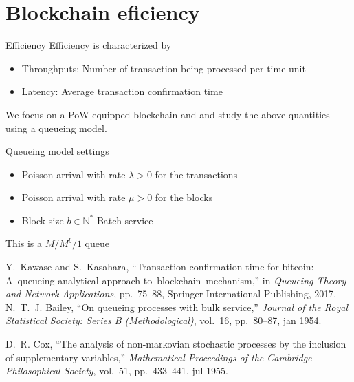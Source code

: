 \documentclass{beamer}
\begin{document}
{\section{Blockchain eficiency}
\begin{frame}{Efficiency}
Efficiency is characterized by 
\begin{itemize}
  \item Throughputs: Number of transaction being processed per time unit
  \item Latency: Average transaction confirmation time
\end{itemize}
We focus on a PoW equipped blockchain and and study the above quantities using a queueing model.
\end{frame}
\begin{frame}{Queueing model settings}
\begin{itemize}
\item Poisson arrival with rate $\lambda>0$ for the transactions
\item Poisson arrival with rate $\mu>0$ for the blocks 
\item Block size $b\in\mathbb{N}^\ast$
Batch service
\end{itemize}
This is a $M/M^b/1$ queue \cite{Bailey1954} \cite{Cox1955}
\tiny
\begin{thebibliography}{1}
Y.~Kawase and S.~Kasahara, ``Transaction-confirmation time for bitcoin:
  A~queueing analytical approach to~blockchain~mechanism,'' in {\em Queueing
  Theory and Network Applications}, pp.~75--88, Springer International
  Publishing, 2017.
N.~T.~J. Bailey, ``On queueing processes with bulk service,'' {\em Journal of
  the Royal Statistical Society: Series B (Methodological)}, vol.~16,
  pp.~80--87, jan 1954.

D.~R. Cox, ``The analysis of non-markovian stochastic processes by the
  inclusion of supplementary variables,'' {\em Mathematical Proceedings of the
  Cambridge Philosophical Society}, vol.~51, pp.~433--441, jul 1955.


\end{thebibliography}
\end{frame}}
\end{document}
